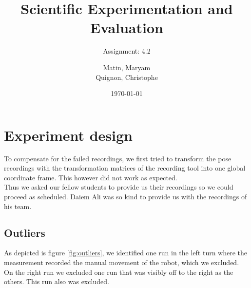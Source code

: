\documentclass{scrartcl}
\begin{document}
\title{Scientific Experimentation and Evaluation
}
\subtitle{
Assignment: 4.2}
\author{
  Matin, Maryam \\
  Quignon, Christophe
}
\date{\today}


\maketitle


\section{Experiment design}
To compensate for the failed recordings, we first tried to transform the pose recordings with the transformation matrices of the recording tool into one global coordinate frame. This however did not work as expected.\\
Thus we asked our fellow students to provide us their recordings so we could proceed as scheduled. Daiem Ali was so kind to provide us with the recordings of his team.



\subsection{Outliers}
As depicted is figure \ref{fig:outliers}, we identified one run in the left turn where the measurement recorded the manual movement of the robot, which we excluded. On the right run we excluded one run that was visibly off to the right as the others. This run also was excluded.
\end{document}
